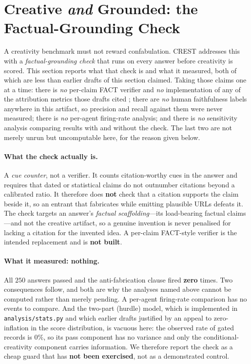 \section{Creative \emph{and} Grounded: the Factual-Grounding Check}
\label{sec:grounding}

A creativity benchmark must not reward confabulation. CREST addresses this with a
\emph{factual-grounding check} that runs on every answer before creativity is scored. This section
reports what that check is and what it measured, both of which are less than earlier drafts of this
section claimed. Taking those claims one at a time: there is \emph{no} per-claim FACT verifier and
\emph{no} implementation of any of the attribution metrics those drafts cited
\citep{gao2023alce,rashkin2023ais,min2023factscore,du2025deepresearchbench}; there are \emph{no} human
faithfulness labels anywhere in this artifact, so precision and recall against them were never
measured; there is \emph{no} per-agent firing-rate analysis; and there is \emph{no} sensitivity
analysis comparing results with and without the check. The last two are not merely unrun but
uncomputable here, for the reason given below.

\paragraph{What the check actually is.} A \emph{cue counter}, not a verifier. It counts
citation-worthy cues in the answer and requires that dated or statistical claims do not outnumber
citations beyond a calibrated ratio. It therefore does \textbf{not} check that a citation supports
the claim beside it, so an entrant that fabricates while emitting plausible URLs defeats it. The
check targets an answer's \emph{factual scaffolding}---its load-bearing factual claims---and not the
creative artifact, so a genuine invention is never penalised for lacking a citation for the invented
idea. A per-claim FACT-style verifier is the intended replacement and is \textbf{not built}.

\paragraph{What it measured: nothing.} All $250$ answers passed and the anti-fabrication clause fired
\textbf{zero} times. Two consequences follow, and both are why the analyses named above cannot be
computed rather than merely pending. A per-agent firing-rate comparison has no events to compare. And
the two-part (hurdle) model, which is implemented in \texttt{analysis/stats.py} and which earlier
drafts justified by an appeal to zero-inflation in the score distribution, is vacuous here: the
observed rate of gated records is $0\%$, so its pass component has no variance and only the
conditional-creativity component carries information. We therefore report the check as a cheap guard
that has \textbf{not been exercised}, not as a demonstrated control.

